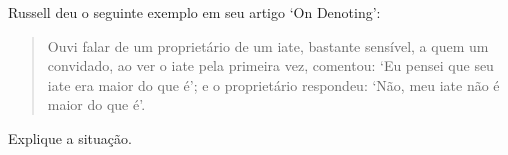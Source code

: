\problempart
Russell deu o seguinte exemplo em seu artigo `On Denoting':

\begin{quote}
    Ouvi falar de um proprietário de um iate, bastante sensível, a quem um convidado, ao ver o iate pela primeira vez, comentou: `Eu pensei que seu iate era maior do que é'; e o proprietário respondeu: `Não, meu iate não é maior do que é'.
\end{quote}

Explique a situação.
